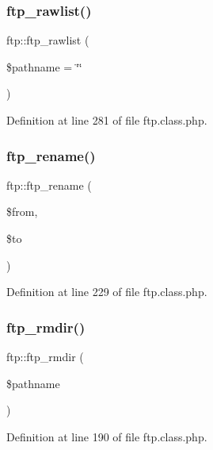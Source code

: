 \subsubsection{\texorpdfstring{ftp\+\_\+rawlist()}{ftp\_rawlist()}}
{\footnotesize\ttfamily ftp\+::ftp\+\_\+rawlist (\begin{DoxyParamCaption}\item[{}]{\$pathname = {\ttfamily \char`\"{}\char`\"{}} }\end{DoxyParamCaption})}



Definition at line 281 of file ftp.\+class.\+php.

\hypertarget{classftp_a967cb22d8ccb9b5493cc46b32956c10f}{}\label{classftp_a967cb22d8ccb9b5493cc46b32956c10f} 
\subsubsection{\texorpdfstring{ftp\+\_\+rename()}{ftp\_rename()}}
{\footnotesize\ttfamily ftp\+::ftp\+\_\+rename (\begin{DoxyParamCaption}\item[{}]{\$from,  }\item[{}]{\$to }\end{DoxyParamCaption})}



Definition at line 229 of file ftp.\+class.\+php.

\hypertarget{classftp_ad3b2c9cca8a01e60b4bbe1b6fa347057}{}\label{classftp_ad3b2c9cca8a01e60b4bbe1b6fa347057} 
\subsubsection{\texorpdfstring{ftp\+\_\+rmdir()}{ftp\_rmdir()}}
{\footnotesize\ttfamily ftp\+::ftp\+\_\+rmdir (\begin{DoxyParamCaption}\item[{}]{\$pathname }\end{DoxyParamCaption})}



Definition at line 190 of file ftp.\+class.\+php.

\hypertarget{classftp_ad8d0e176790559ee27d1008dede58b6a}{}\label{classftp_ad8d0e176790559ee27d1008dede58b6a} 
